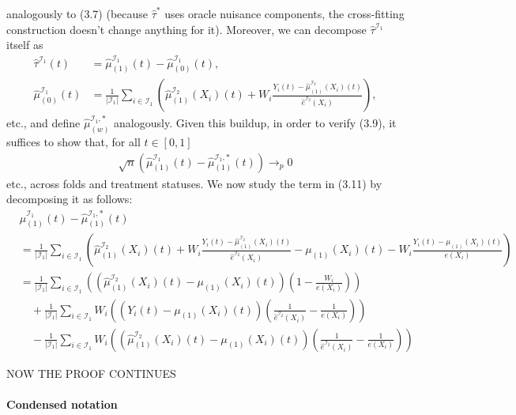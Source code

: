 analogously to (3.7) (because $\hat{\tau}^\ast$ uses oracle nuisance components, the
cross-fitting construction doesn't change anything for it). Moreover, we can decompose
$\hat{\tau}^{\mathcal{I}_1}$ itself as
\begin{align}
   \hat{\tau}^{\mathcal{I}_1}(t) &= \hat{\mu}_{(1)}^{\mathcal{I}_1}(t) -
    \hat{\mu}_{(0)}^{\mathcal{I}_1}(t),\\
   \hat{\mu}_{(0)}^{\mathcal{I}_1}(t) &= \frac{1}{|\mathcal{I}_1|} \sum_{i \in
    \mathcal{I}_1} (\hat{\mu}_{(1)}^{\mathcal{I}_2}(X_i)(t) + W_i \frac{Y_i(t) -
    \hat{\mu}_{(1)}^{\mathcal{I}_2}(X_i)(t)}{\hat{e}^{\mathcal{I}_2}(X_i)}),
\end{align}
etc., and define $\hat{\mu}_{(w)}^{\mathcal{I}_1, \ast}$ analogously. Given this
buildup, in order to verify (3.9), it suffices to show that, for all $t \in [0, 1]$
\begin{align}
    \sqrt{n} (\hat{\mu}_{(1)}^{\mathcal{I}_1}(t) - \hat{\mu}_{(1)}^{\mathcal{I}_1,
    \ast}(t)) \to_p 0
\end{align}
etc., across folds and treatment statuses.
We now study the term in (3.11) by decomposing it as follows:
\begin{align*}
    &\hat{\mu}_{(1)}^{\mathcal{I}_1}(t) - \hat{\mu}_{(1)}^{\mathcal{I}_1,\ast}(t)\\
    &= \frac{1}{|\mathcal{I}_{1}|} \sum_{i \in
    \mathcal{I}_{1}}(\hat{\mu}_{(1)}^{\mathcal{I}_{2}}(X_{i})(t)+W_{i}
    \frac{Y_{i}(t)-\hat{\mu}_{(1)}^{\mathcal{I}_{2}}(X_{i})(t)}{\hat{e}^{\mathcal{I}_{2}}(X_{i})}-\mu_{(1)}(X_{i})(t)-W_{i}
    \frac{Y_{i}(t)-\mu_{(1)}(X_{i})(t)}{e(X_{i})}) \\
    &= \frac{1}{|\mathcal{I}_{1}|} \sum_{i \in
    \mathcal{I}_{1}}((\hat{\mu}_{(1)}^{\mathcal{I}_{2}}(X_{i})(t)-\mu_{(1)}(X_{i})(t))(1-\frac{W_{i}}{e(X_{i})}))\\
    & \quad+\frac{1}{|\mathcal{I}_{1}|} \sum_{i \in \mathcal{I}_{1}}
    W_{i}((Y_{i}(t)-\mu_{(1)}(X_{i})(t))(\frac{1}{\hat{e}^{\mathcal{I}_{2}}(X_{i})}-\frac{1}{e(X_{i})}))
    \\
    & \quad-\frac{1}{|\mathcal{I}_{1}|} \sum_{i \in \mathcal{I}_{1}}
    W_{i}((\hat{\mu}_{(1)}^{\mathcal{I}_{2}}(X_{i})(t)-\mu_{(1)}(X_{i})(t))(\frac{1}{\hat{e}^{\mathcal{I}_{2}}(X_{i})}-\frac{1}{e(X_{i})}))
\end{align*}



NOW THE PROOF CONTINUES


\paragraph{Condensed notation}


